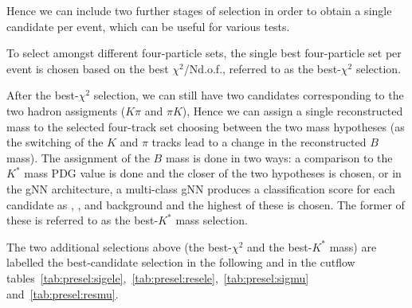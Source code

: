 Hence we can include two further stages of selection in order to
obtain a single candidate per event, which can be useful for various tests.

To select amongst different four-particle sets, the single best four-particle set per event is
chosen based on the best $\chi^2$/Nd.o.f., referred to as the best-$\chi^2$ selection.

After the best-$\chi^2$ selection, we can still have two candidates corresponding to the two
hadron assigments ($K\pi$ and $\pi K$), Hence we can assign a single reconstructed mass to
the selected four-track set choosing between the two mass hypotheses (as the switching of
the $K$ and $\pi$ tracks lead to a change in the reconstructed $B$ mass).
The assignment of the $B$ mass is done in two ways: a comparison to the $K^*$ mass PDG value
is done and the closer of the two hypotheses is chosen, or in the gNN architecture,
a multi-class gNN produces a classification score for each candidate as \Bd, \Bdb, and background
and the highest of these is chosen.
The former of these is referred to as the best-$K^*$ mass selection.

The two additional selections above (the best-$\chi^2$ and the best-$K^*$ mass) are labelled
the best-candidate selection in the following and in the cutflow
tables~\ref{tab:presel:sigele},~\ref{tab:presel:resele},~\ref{tab:presel:sigmu} and~\ref{tab:presel:resmu}.






